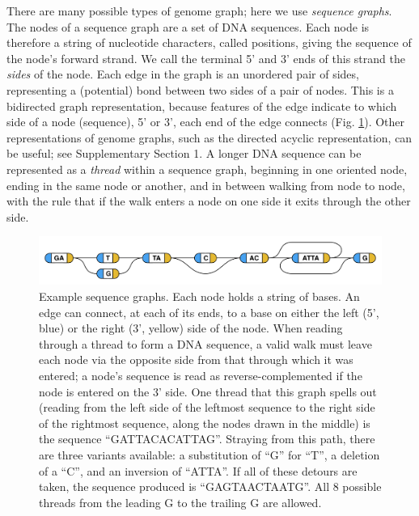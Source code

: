 There are many possible types of genome graph; here we use
\emph{sequence graphs}. The nodes of a sequence graph are a set of DNA
sequences. Each node is therefore a string of nucleotide characters,
called positions, giving the sequence of the node's forward strand. We
call the terminal 5' and 3' ends of this strand the \emph{sides} of the
node. Each edge in the graph is an unordered pair of sides, representing
a (potential) bond between two sides of a pair of nodes. This is a
bidirected graph representation, because features of the edge indicate
to which side of a node (sequence), 5' or 3', each end of the edge
connects (Fig. \ref{fig:bakeoff:example})\cite{Medvedev2009-hy}. Other representations of genome
graphs, such as the directed acyclic representation, can be useful; see
Supplementary Section 1. A longer DNA sequence can be represented as a
\emph{thread} within a sequence graph, beginning in one oriented node,
ending in the same node or another, and in between walking from node to
node, with the rule that if the walk enters a node on one side it exits
through the other side.

\begin{figure}[htbp]
\centering
\includegraphics[width=\textwidth]{figures/04_bakeoff/figure01.png}
\caption[Example sequence graphs]{Example sequence graphs. Each node holds a string of bases. An
edge can connect, at each of its ends, to a base on either the left (5',
blue) or the right (3', yellow) side of the node. When reading through a
thread to form a DNA sequence, a valid walk must leave each node via the
opposite side from that through which it was entered; a node's sequence
is read as reverse-complemented if the node is entered on the 3' side.
One thread that this graph spells out (reading from the left side of the
leftmost sequence to the right side of the rightmost sequence, along the
nodes drawn in the middle) is the sequence ``GATTACACATTAG''. Straying
from this path, there are three variants available: a substitution of
``G'' for ``T'', a deletion of a ``C'', and an inversion of ``ATTA''. If
all of these detours are taken, the sequence produced is
``GAGTAACTAATG''. All 8 possible threads from the leading G to the
trailing G are allowed.}
\label{fig:bakeoff:example}
\end{figure}



